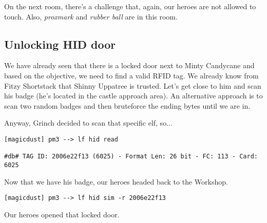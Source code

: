 On the next room, there's a challenge that, again, our heroes are not allowed to touch. Also, \textit{proxmark} and \textit{rubber ball} are in this room.

\subsection{Unlocking HID door}
We have already seen that there is a locked door next to {\color{codegreen}Minty Candycane} and based on the objective, we need to find a valid RFID tag. We already know from {\color{codegreen}Fitzy Shortstack} that {\color{codegreen}Shinny Uppatree} is trusted. Let's get close to him and scan his badge (he's located in the castle approach area).
An alternative approach is to scan two random badges and then bruteforce the ending bytes until we are in.

Anyway, Grinch decided to scan that specific elf, so...

\begin{verbatim}
[magicdust] pm3 --> lf hid read

#db# TAG ID: 2006e22f13 (6025) - Format Len: 26 bit - FC: 113 - Card: 6025
\end{verbatim}

Now that we have his badge, our heroes headed back to the Workshop.
\begin{verbatim}
[magicdust] pm3 --> lf hid sim -r 2006e22f13
\end{verbatim}

Our heroes opened that locked door.

